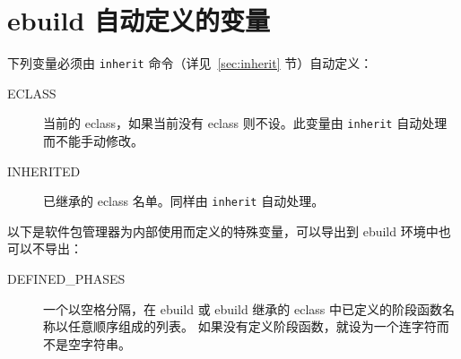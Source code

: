 \section{ebuild 自动定义的变量}

下列变量必须由 \texttt{inherit} 命令（详见~\ref{sec:inherit} 节）自动定义：

\begin{description}
\item[ECLASS] 当前的 eclass，如果当前没有 eclass 则不设。此变量由 \texttt{inherit}
    自动处理而不能手动修改。
\item[INHERITED] 已继承的 eclass 名单。同样由 \texttt{inherit} 自动处理。
\end{description}


以下是软件包管理器为内部使用而定义的特殊变量，可以导出到 ebuild 环境中也可以不导出：

\begin{description}
\item[DEFINED_PHASES] 一个以空格分隔，在 ebuild 或 ebuild 继承的
    eclass 中已定义的阶段函数名称以任意顺序组成的列表。
    如果没有定义阶段函数，就设为一个连字符而不是空字符串。
\end{description}



